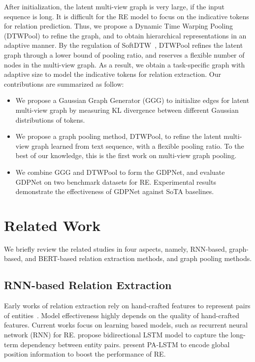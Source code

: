 \documentclass[letterpaper]{article} \usepackage{aaai21}  \usepackage{times}  \usepackage{helvet} \usepackage{courier}  \usepackage[hyphens]{url}  \usepackage{graphicx} \urlstyle{rm} \def\UrlFont{\rm}  \usepackage{graphicx}  \usepackage{natbib}  \usepackage{caption}
\begin{document}
After initialization, the latent multi-view graph is very large, if the input sequence is long. It is difficult for the RE model to focus on the indicative  tokens for relation prediction. Thus, we propose a Dynamic Time Warping Pooling (DTWPool) to refine the graph, and to obtain hierarchical representations in an adaptive manner. By the regulation of SoftDTW~\cite{cuturi2017soft}, DTWPool refines the latent graph through a lower bound of pooling ratio, and reserves a flexible number of nodes in the multi-view graph. As a result, we obtain a task-specific graph with adaptive size to model the indicative tokens for relation extraction. Our contributions are summarized as follow:




\begin{itemize}
\item We propose a Gaussian Graph Generator (GGG) to initialize edges for latent multi-view graph by measuring KL divergence between different Gaussian distributions of tokens.
\item We propose a graph pooling method, DTWPool, to refine the latent multi-view graph learned from text sequence, with a flexible pooling ratio. To the best of our knowledge, this is the first work on multi-view graph pooling.
\item We combine GGG and DTWPool to form the GDPNet, and evaluate GDPNet on two benchmark datasets for RE. Experimental results demonstrate the effectiveness of GDPNet against SoTA baselines.


\end{itemize}

\section{Related Work}
\label{sec:relate}
We briefly review the related studies in four aspects, namely, RNN-based, graph-based, and BERT-based relation extraction methods, and graph pooling methods.

\subsection{RNN-based Relation Extraction}
Early works of relation extraction rely on hand-crafted features to represent pairs of entities~\cite{miwa2014modeling,gormley-etal-2015-improved}. Model effectiveness highly depends on the quality of hand-crafted features. Current works focus on learning based models, such as recurrent neural network (RNN) for RE. \citet{zhou-etal-2016-attention-based} propose bidirectional LSTM model to capture the long-term dependency between entity pairs. \citet{zhang-etal-2017-position} present PA-LSTM to encode global position information to boost the performance of RE.
\end{document}
